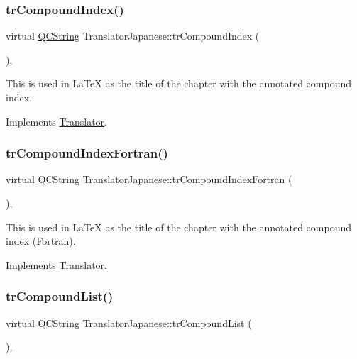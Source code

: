 \subsubsection{\texorpdfstring{trCompoundIndex()}{trCompoundIndex()}}
{\footnotesize\ttfamily virtual \mbox{\hyperlink{class_q_c_string}{Q\+C\+String}} Translator\+Japanese\+::tr\+Compound\+Index (\begin{DoxyParamCaption}{ }\end{DoxyParamCaption})\hspace{0.3cm}{\ttfamily [inline]}, {\ttfamily [virtual]}}

This is used in La\+TeX as the title of the chapter with the annotated compound index. 

Implements \mbox{\hyperlink{class_translator}{Translator}}.

\mbox{\label{class_translator_japanese_a21fe76ea8b0c8c210a94c65d171dcc60}} 
\subsubsection{\texorpdfstring{trCompoundIndexFortran()}{trCompoundIndexFortran()}}
{\footnotesize\ttfamily virtual \mbox{\hyperlink{class_q_c_string}{Q\+C\+String}} Translator\+Japanese\+::tr\+Compound\+Index\+Fortran (\begin{DoxyParamCaption}{ }\end{DoxyParamCaption})\hspace{0.3cm}{\ttfamily [inline]}, {\ttfamily [virtual]}}

This is used in La\+TeX as the title of the chapter with the annotated compound index (Fortran). 

Implements \mbox{\hyperlink{class_translator}{Translator}}.

\mbox{\label{class_translator_japanese_a45a18ebd0370b6b778e5c00670800f45}} 
\subsubsection{\texorpdfstring{trCompoundList()}{trCompoundList()}}
{\footnotesize\ttfamily virtual \mbox{\hyperlink{class_q_c_string}{Q\+C\+String}} Translator\+Japanese\+::tr\+Compound\+List (\begin{DoxyParamCaption}{ }\end{DoxyParamCaption})\hspace{0.3cm}{\ttfamily [inline]}, {\ttfamily [virtual]}}

